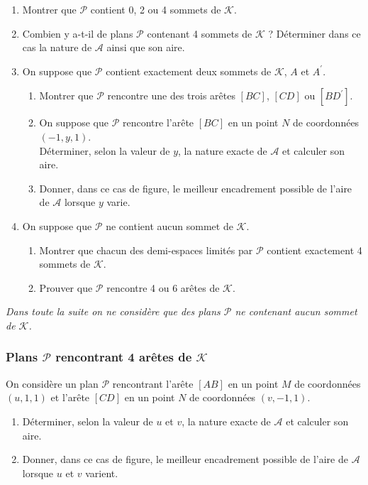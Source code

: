 \documentclass[landscape,twocolumn,leqno,a4paper,10pt]{report} %
\newcommand\n{\noindent}
\begin{document}
\begin{enumerate}
	\item Montrer que $\mathscr{P}$ contient 0, 2 ou 4 sommets de $\mathscr{K}$.
	\item Combien y a-t-il de plans $\mathscr{P}$ contenant 4 sommets de $\mathscr{K}$ ? Déterminer dans ce cas la nature de $\mathscr{A}$ ainsi que son aire.
	\item On suppose que $\mathscr{P}$ contient exactement deux sommets de $\mathscr{K}$, $A$ et $A^{\prime}$.
	\begin{enumerate}
		\item Montrer que $\mathscr{P}$ rencontre une des trois arêtes $[B C]$, $[C D]$ ou $\left[B D^{\prime}\right]$.
		\item On suppose que $\mathscr{P}$ rencontre l'arête $[B C]$ en un point $N$ de coordonnées $(-1, y, 1)$.\\
		Déterminer, selon la valeur de $y$, la nature exacte de $\mathscr{A}$ et calculer son aire.
		\item Donner, dans ce cas de figure, le meilleur encadrement possible de l'aire de $\mathscr{A}$ lorsque $y$ varie.
	\end{enumerate}
	\item On suppose que $\mathscr{P}$ ne contient aucun sommet de $\mathscr{K}$.
	\begin{enumerate}
		\item Montrer que chacun des demi-espaces limités par $\mathscr{P}$ contient exactement 4 sommets de $\mathscr{K}$.
		\item Prouver que $\mathscr{P}$ rencontre 4 ou 6 arêtes de $\mathscr{K}$.
	\end{enumerate}
\end{enumerate}

\n \textit{Dans toute la suite on ne considère que des plans $\mathscr{P}$ ne contenant aucun sommet de $\mathscr{K}$.}

\subsubsection{Plans $\mathscr{P}$ rencontrant 4 arêtes de $\mathscr{K}$}

\n On considère un plan $\mathscr{P}$ rencontrant l'arête $[A B]$ en un point $M$ de coordonnées $(u, 1,1)$ et l'arête $[C D]$ en un point $N$ de coordonnées $(v,-1,1)$.

\begin{enumerate}
	\item Déterminer, selon la valeur de $u$ et $v$, la nature exacte de $\mathscr{A}$ et calculer son aire.
	\item Donner, dans ce cas de figure, le meilleur encadrement possible de l'aire de $\mathscr{A}$ lorsque $u$ et $v$ varient.
\end{enumerate}
\end{document}
